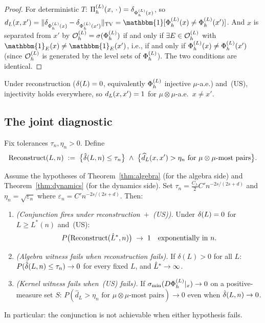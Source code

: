 \begin{proof}
For deterministic $T$:
$\Pi_h^{(L)}(x,\,\cdot\,) = \delta_{\Phi_h^{(L)}(x)}$, so
$\preddisc{L}(x,x') = \|\delta_{\PhiL(x)} - \delta_{\PhiL(x')}\|_{\mathrm{TV}}
= \mathbbm{1}[\PhiL(x) \neq \PhiL(x')]$.
And $x$ is separated from $x'$ by $\mathcal{O}_h^{(L)} = \sigma(\Phi_h^{(L)})$ if and only if
$\exists E \in \mathcal{O}_h^{(L)}$ with $\mathbbm{1}_E(x) \neq \mathbbm{1}_E(x')$, i.e.,
if and only if $\Phi_h^{(L)}(x) \neq \Phi_h^{(L)}(x')$ (since $\mathcal{O}_h^{(L)}$ is generated by the
level sets of $\Phi_h^{(L)}$).
The two conditions are identical.
\end{proof}

Under reconstruction ($\delta(L) = 0$, equivalently $\Phi_h^{(L)}$ injective $\mu$-a.e.)
and~(US), injectivity holds everywhere, so $d_{L}(x,x') = 1$ for
$\mu \otimes \mu$-a.e.\ $x \neq x'$.

\subsection{The joint diagnostic}

\begin{definition}
\label{def:diagnostic}
Fix tolerances $\tau_n, \eta_n > 0$.
Define
\[
  \mathrm{Reconstruct}(L, n)
  \;:=\;
  \bigl\{\hat{\delta}(L,n) \leq \tau_n\bigr\}
  \;\wedge\;
  \bigl\{\widehat{d}_L(x,x') > \eta_n
    \text{ for $\mu \otimes \mu$-most pairs}\bigr\}.
\]
\end{definition}

\begin{theorem}
\label{thm:conjunction}
Assume the hypotheses of Theorem~\ref{thm:algebra} (for the algebra side)
and Theorem~\ref{thm:dynamics} (for the dynamics side).
Set $\tau_n = \frac{C_\lambda}{2} C' n^{-2s/(2s+d)}$ and
$\eta_n = \sqrt{\varepsilon_n}$ where $\varepsilon_n = C' n^{-2s/(2s+d)}$.
Then:
\begin{enumerate}[label=(\alph*)]
  \item \emph{(Conjunction fires under reconstruction~$+$~(US)).}
    Under $\delta(L) = 0$ for $L \geq L^*(n)$ and~(US):
    \[
      P\bigl(\mathrm{Reconstruct}(\hat{L}^*, n)\bigr) \;\to\; 1
      \quad\text{exponentially in } n.
    \]
  \item \emph{(Algebra witness fails when reconstruction fails).}
    If $\delta(L) > 0$ for all $L$: $P(\hat{\delta}(L,n) \leq \tau_n) \to 0$
    for every fixed $L$, and $\hat{L}^* \to \infty$.

  \item \emph{(Kernel witness fails when~(US) fails).}
    If $\sigma_{\min}(D\Phi_h^{(L)}|_x) \to 0$ on a positive-measure set $S$:
    $P(\widehat{d}_L > \eta_n \text{ for }\mu\otimes\mu\text{-most pairs}) \to 0$
    even when $\hat{\delta}(L,n) \to 0$.
\end{enumerate}
In particular: the conjunction is not achievable when either hypothesis fails.
\end{theorem}

